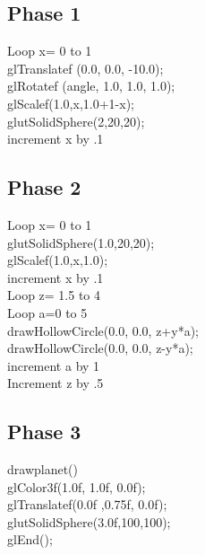 \documentclass[letterpaper, 10 pt, conference]{ieeeconf}  %
\begin{document}
\subsection{Phase 1}
      \hspace*{5mm} Loop x= 0 to 1\\
      \hspace*{15mm}  glTranslatef (0.0, 0.0, -10.0);\\
  	  \hspace*{15mm} glRotatef (angle, 1.0, 1.0, 1.0);\\
      \hspace*{15mm} glScalef(1.0,x,1.0+1-x);\\
      \hspace*{15mm}  glutSolidSphere(2,20,20);\\
	  \hspace*{15mm} increment x by .1\\
\subsection{Phase 2}

     \hspace*{5mm}Loop x= 0 to 1\\
      \hspace*{15mm}	glutSolidSphere(1.0,20,20);\\
      	\hspace*{15mm}	glScalef(1.0,x,1.0);\\
      	\hspace*{15mm}	increment x by .1\\ 
    	\hspace*{10mm}Loop z= 1.5 to 4	\\
		\hspace*{15mm}Loop a=0 to 5	\\	
			\hspace*{25mm} drawHollowCircle(0.0, 0.0, z+y*a);\\
 			\hspace*{25mm} drawHollowCircle(0.0, 0.0, z-y*a);\\
 			\hspace*{25mm}increment a by 1\\
		\hspace*{15mm}Increment z by .5\\
\subsection{Phase 3}
 \hspace*{5mm}drawplanet()\\
	\hspace*{10mm}	glColor3f(1.0f, 1.0f, 0.0f);\\
	\hspace*{10mm}	glTranslatef(0.0f ,0.75f, 0.0f);\\
	\hspace*{10mm}	glutSolidSphere(3.0f,100,100);\\
    \hspace*{10mm}		glEnd();\\
\end{document}

